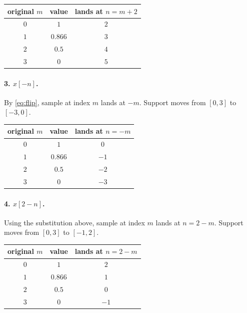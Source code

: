 \begin{center}
\begin{tabular}{ccc}
  \toprule
  original $m$ & value & lands at $n = m+2$ \\
  \midrule
  $0$ & $1$     & $2$ \\
  $1$ & $0.866$ & $3$ \\
  $2$ & $0.5$   & $4$ \\
  $3$ & $0$     & $5$ \\
  \bottomrule
\end{tabular}
\end{center}

\begin{center}
\end{center}

\paragraph{3. $x[-n]$.}
By \eqref{eq:flip}, sample at index $m$ lands at $-m$. Support moves from
$[0,3]$ to $[-3,0]$.

\begin{center}
\begin{tabular}{ccc}
  \toprule
  original $m$ & value & lands at $n = -m$ \\
  \midrule
  $0$ & $1$     & $0$  \\
  $1$ & $0.866$ & $-1$ \\
  $2$ & $0.5$   & $-2$ \\
  $3$ & $0$     & $-3$ \\
  \bottomrule
\end{tabular}
\end{center}

\begin{center}
\end{center}

\paragraph{4. $x[2-n]$.}
Using the substitution above, sample at index $m$ lands at $n = 2-m$. Support
moves from $[0,3]$ to $[-1,2]$.

\begin{center}
\begin{tabular}{ccc}
  \toprule
  original $m$ & value & lands at $n = 2-m$ \\
  \midrule
  $0$ & $1$     & $2$  \\
  $1$ & $0.866$ & $1$  \\
  $2$ & $0.5$   & $0$  \\
  $3$ & $0$     & $-1$ \\
  \bottomrule
\end{tabular}
\end{center}

